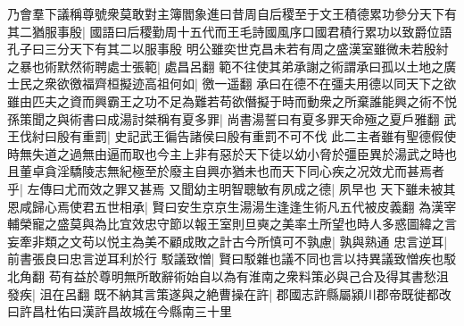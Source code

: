 乃會羣下議稱尊號衆莫敢對主簿閻象進曰昔周自后稷至于文王積德累功參分天下有其二猶服事殷|{
	國語曰后稷勤周十五代而王毛詩國風序口國君積行累功以致爵位語孔子曰三分天下有其二以服事殷}
明公雖奕世克昌未若有周之盛漢室雖微未若殷紂之暴也術默然術聘處士張範|{
	處昌呂翻}
範不往使其弟承謝之術謂承曰孤以土地之廣士民之衆欲徼福齊桓擬迹高祖何如|{
	徼一遥翻}
承曰在德不在彊夫用德以同天下之欲雖由匹夫之資而興霸王之功不足為難若苟欲僭擬于時而動衆之所棄誰能興之術不悦孫策聞之與術書曰成湯討桀稱有夏多罪|{
	尚書湯誓曰有夏多罪天命殛之夏戶雅翻}
武王伐紂曰殷有重罰|{
	史記武王徧告諸侯曰殷有重罰不可不伐}
此二主者雖有聖德假使時無失道之過無由逼而取也今主上非有惡於天下徒以幼小脅於彊臣異於湯武之時也且董卓貪淫驕陵志無紀極至於廢主自興亦猶未也而天下同心疾之况效尤而甚焉者乎|{
	左傳曰尤而效之罪又甚焉}
又聞幼主明智聰敏有夙成之德|{
	夙早也}
天下雖未被其恩咸歸心焉使君五世相承|{
	賢曰安生京京生湯湯生逢逢生術凡五代被皮義翻}
為漢宰輔榮寵之盛莫與為比宜效忠守節以報王室則旦奭之美率土所望也時人多惑圖緯之言妄牽非類之文苟以悦主為美不顧成敗之計古今所慎可不孰慮|{
	孰與熟通}
忠言逆耳|{
	前書張良曰忠言逆耳利於行}
駁議致憎|{
	賢曰駁雜也議不同也言以持異議致憎疾也駁北角翻}
苟有益於尊明無所敢辭術始自以為有淮南之衆料策必與己合及得其書愁沮發疾|{
	沮在呂翻}
既不納其言策遂與之絶曹操在許|{
	郡國志許縣屬潁川郡帝既徙都改曰許昌杜佑曰漢許昌故城在今縣南三十里}


